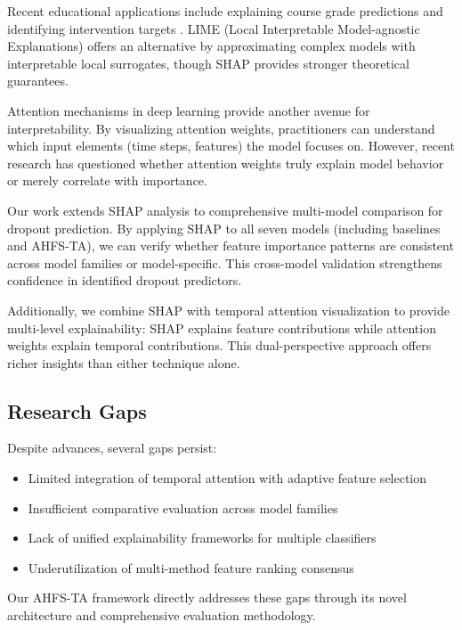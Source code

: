 \documentclass[journal]{IEEEtran}
\begin{document}
Recent educational applications include explaining course grade predictions \cite{swamy2022explainable} and identifying intervention targets \cite{khosravi2022explainable}. LIME (Local Interpretable Model-agnostic Explanations) offers an alternative by approximating complex models with interpretable local surrogates, though SHAP provides stronger theoretical guarantees.

Attention mechanisms in deep learning provide another avenue for interpretability. By visualizing attention weights, practitioners can understand which input elements (time steps, features) the model focuses on. However, recent research has questioned whether attention weights truly explain model behavior or merely correlate with importance.

Our work extends SHAP analysis to comprehensive multi-model comparison for dropout prediction. By applying SHAP to all seven models (including baselines and AHFS-TA), we can verify whether feature importance patterns are consistent across model families or model-specific. This cross-model validation strengthens confidence in identified dropout predictors.

Additionally, we combine SHAP with temporal attention visualization to provide multi-level explainability: SHAP explains feature contributions while attention weights explain temporal contributions. This dual-perspective approach offers richer insights than either technique alone.

\subsection{Research Gaps}

Despite advances, several gaps persist:
\begin{itemize}
\item Limited integration of temporal attention with adaptive feature selection
\item Insufficient comparative evaluation across model families
\item Lack of unified explainability frameworks for multiple classifiers
\item Underutilization of multi-method feature ranking consensus
\end{itemize}

Our AHFS-TA framework directly addresses these gaps through its novel architecture and comprehensive evaluation methodology.

\end{document}
